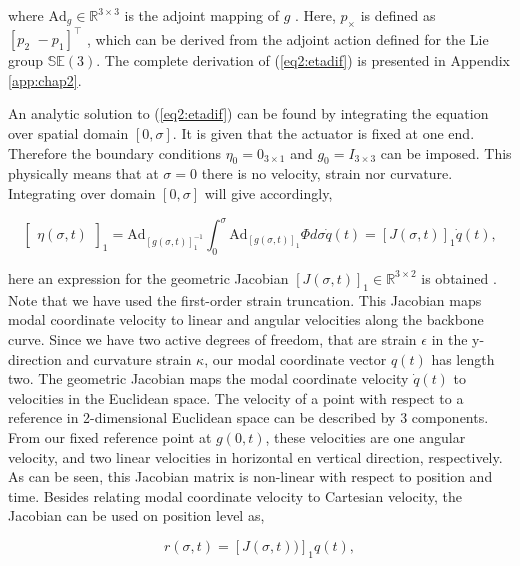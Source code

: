 where $\text{Ad}_g \in \mathbb{R}^{3 \times 3}$ \cite{2DLie} is the adjoint mapping of $g$ \cite{Sola2018}. Here, $p_\times$ is defined as $[p_2 \hspace{4pt} -p_1]^\top$ \cite{2DLie}, which can be derived from the adjoint action defined for the Lie group $\mathbb{SE}(3)$. The complete derivation of (\ref{eq2:etadif}) is presented in Appendix \ref{app:chap2}. 

An analytic solution to (\ref{eq2:etadif}) can be found by integrating the equation over spatial domain $[0,\sigma]$. It is given that the actuator is fixed at one end. Therefore the boundary conditions $\eta_0 = 0_{3 \times 1}$ and $g_0 = I_{3\times 3}$ can be imposed. This physically means that at $\sigma = 0$ there is no velocity, strain nor curvature. Integrating over domain $[0,\sigma]$ will give accordingly,

\begin{equation}
  \begin{bmatrix} \eta(\sigma,t)\end{bmatrix}_1 = \text{Ad}_{[g(\sigma,t)]_1^{-1}} \int_0^{\sigma} \text{Ad}_{[g(\sigma,t)]_1} \Phi d \sigma \dot{q}(t) = [J(\sigma,t)]_1\dot{q}(t),
    \label{eq2:J}
\end{equation}

here an expression for the geometric Jacobian $[J(\sigma,t)]_1 \in \mathbb{R}^{3\times 2}$ is obtained \cite{Caasenbrood2020}. Note that we have used the first-order strain truncation. This Jacobian maps modal coordinate velocity to linear and angular velocities along the backbone curve. Since we have two active degrees of freedom, that are strain $\epsilon$ in the y-direction and curvature strain $\kappa$, our modal coordinate vector $q(t)$ has length two. The geometric Jacobian maps the modal coordinate velocity $\dot{q}(t)$ to velocities in the Euclidean space. The velocity of a point with respect to a reference in 2-dimensional Euclidean space can be described by 3 components. From our fixed reference point at $g(0,t)$, these velocities are one angular velocity, and two linear velocities in horizontal en vertical direction, respectively. As can be seen, this Jacobian matrix is non-linear with respect to position and time. Besides relating modal coordinate velocity to Cartesian velocity, the Jacobian can be used on position level as,

\begin{equation}
    r(\sigma,t) = [J(\sigma,t))]_1q(t),
\end{equation}

